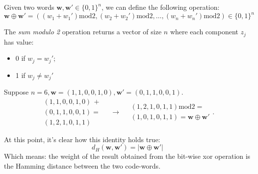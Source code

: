 \begin{definition}
Given two words $\textbf{w}, \textbf{w}' \in \{0,1\}^n$, we can define the following operation:
\begin{equation}
    \textbf{w} \oplus \textbf{w}' = ((w_1 + w_1')\text{mod}2, (w_2 + w_2')\text{mod}2, \ldots, (w_n + w_n')\text{mod}2) \in \{0,1\}^n
\end{equation}
\end{definition}
The \emph{sum modulo 2} operation returns a vector of size $n$ where each component  $z_j$ has value:
\begin{itemize}
    \item 0 if $w_j = w_j'$;
    \item 1 if $w_j \neq w_j'$
\end{itemize}

\begin{example}
Suppose $n=6, \textbf{w} = (1, 1, 0, 0, 1, 0), \textbf{w}' = (0, 1, 1, 0, 0, 1)$.
\begin{equation*}
\begin{array}{l}
(1, 1, 0, 0, 1, 0) \,+ \\
(0, 1, 1, 0, 0, 1) = \\  \hline
(1, 2, 1, 0, 1, 1)
\end{array}
\quad\rightarrow\quad
\begin{array}{l}
(1, 2, 1, 0, 1, 1)\text{mod} 2 = \\ \hline
(1, 0, 1, 0, 1, 1) = \textbf{w} \oplus \textbf{w}'
\end{array}.
\end{equation*}
\end{example}

At this point, it's clear how this identity holds true:
\begin{equation}
    d_H(\textbf{w}, \textbf{w}') = |\textbf{w} \oplus \textbf{w}'|
\end{equation}
Which means: the weight of the result obtained from the bit-wise xor operation is the Hamming distance between the two code-words.

